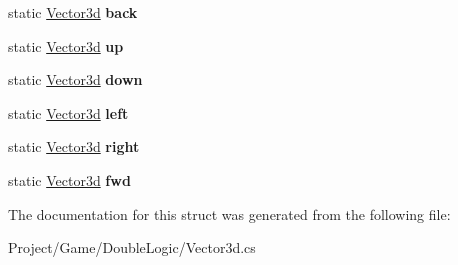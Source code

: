 \begin{DoxyCompactItemize}
\item 
\mbox{\label{struct_unity_engine_1_1_vector3d_a49630b1457f154afafb80599389973d7}} 
static \hyperlink{struct_unity_engine_1_1_vector3d}{Vector3d} {\bfseries back}
\item 
\mbox{\label{struct_unity_engine_1_1_vector3d_accc4bb3fa788895b2e3ba9f61ddc60ca}} 
static \hyperlink{struct_unity_engine_1_1_vector3d}{Vector3d} {\bfseries up}
\item 
\mbox{\label{struct_unity_engine_1_1_vector3d_a5831720b3de2cea092d71c41c7224f4f}} 
static \hyperlink{struct_unity_engine_1_1_vector3d}{Vector3d} {\bfseries down}
\item 
\mbox{\label{struct_unity_engine_1_1_vector3d_acf353751598258aa42288d66a3e378c7}} 
static \hyperlink{struct_unity_engine_1_1_vector3d}{Vector3d} {\bfseries left}
\item 
\mbox{\label{struct_unity_engine_1_1_vector3d_af9eef3de2cdf5153f8aafdf805c9775a}} 
static \hyperlink{struct_unity_engine_1_1_vector3d}{Vector3d} {\bfseries right}
\item 
\mbox{\label{struct_unity_engine_1_1_vector3d_a04acb0f65939bdd654ef5c70e024a1ac}} 
static \hyperlink{struct_unity_engine_1_1_vector3d}{Vector3d} {\bfseries fwd}
\end{DoxyCompactItemize}


The documentation for this struct was generated from the following file\+:\begin{DoxyCompactItemize}
\item 
Project/\+Game/\+Double\+Logic/Vector3d.\+cs\end{DoxyCompactItemize}
